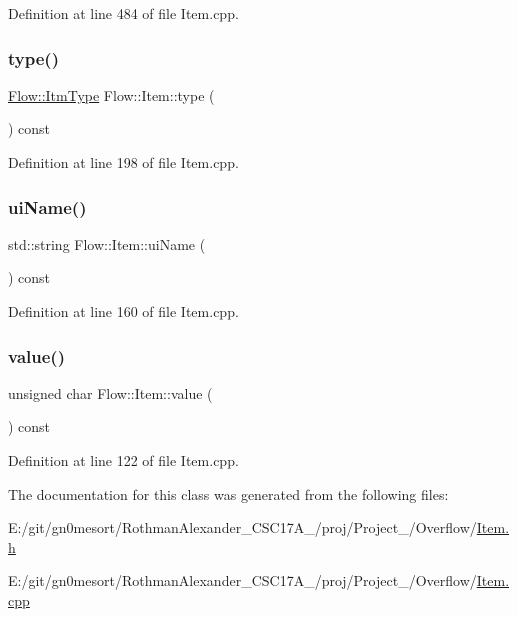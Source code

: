 Definition at line 484 of file Item.\+cpp.

\hypertarget{class_flow_1_1_item_a559618381e678afb9feba88e7d065956}{}\label{class_flow_1_1_item_a559618381e678afb9feba88e7d065956} 
\subsubsection{\texorpdfstring{type()}{type()}}
{\footnotesize\ttfamily \hyperlink{namespace_flow_ab521722c5aec75faa5be9c5ccfff33d6}{Flow\+::\+Itm\+Type} Flow\+::\+Item\+::type (\begin{DoxyParamCaption}{ }\end{DoxyParamCaption}) const}



Definition at line 198 of file Item.\+cpp.

\hypertarget{class_flow_1_1_item_a8ff7cdd3f7c30f3afbf7b1da2845bc20}{}\label{class_flow_1_1_item_a8ff7cdd3f7c30f3afbf7b1da2845bc20} 
\subsubsection{\texorpdfstring{ui\+Name()}{uiName()}}
{\footnotesize\ttfamily std\+::string Flow\+::\+Item\+::ui\+Name (\begin{DoxyParamCaption}{ }\end{DoxyParamCaption}) const}



Definition at line 160 of file Item.\+cpp.

\hypertarget{class_flow_1_1_item_af475c6f792312b9ad95dae06b6cb29b6}{}\label{class_flow_1_1_item_af475c6f792312b9ad95dae06b6cb29b6} 
\subsubsection{\texorpdfstring{value()}{value()}}
{\footnotesize\ttfamily unsigned char Flow\+::\+Item\+::value (\begin{DoxyParamCaption}{ }\end{DoxyParamCaption}) const}



Definition at line 122 of file Item.\+cpp.



The documentation for this class was generated from the following files\+:\begin{DoxyCompactItemize}
\item 
E\+:/git/gn0mesort/\+Rothman\+Alexander\+\_\+\+C\+S\+C17\+A\+\_/proj/\+Project\+\_/\+Overflow/\hyperlink{_item_8h}{Item.\+h}\item 
E\+:/git/gn0mesort/\+Rothman\+Alexander\+\_\+\+C\+S\+C17\+A\+\_/proj/\+Project\+\_/\+Overflow/\hyperlink{_item_8cpp}{Item.\+cpp}\end{DoxyCompactItemize}
